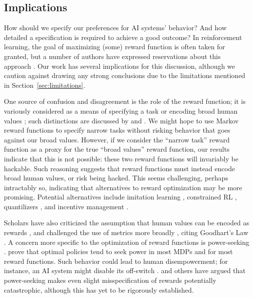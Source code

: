 \documentclass{article}
\theoremstyle{definition}
\theoremstyle{remark}
\begin{document}
\subsection{Implications}\label{sec:implications}

How should we specify our preferences for AI systems' behavior?
And how detailed a specification is required to achieve a good outcome?
In reinforcement learning, the goal of maximizing (some) reward function is often taken for granted, but a number of authors have expressed reservations about this approach \citep{gabriel2020artificial, Dobbe2021hard, Hadfield2016Cooperative, hadfield2017inverse, bostrom2014superintelligence}.
Our work has several implications for this discussion, although we caution against drawing any strong conclusions due to the limitations mentioned in Section~\ref{sec:limitations}.

One source of confusion and disagreement is the role of the reward function; it is variously considered as a means of specifying a task \citep{leike2018scalable} or encoding broad human values \citep{Dewey2011learning}; such distinctions are discussed by \citet{christiano_narrow_alignment} and \citet{gabriel2020artificial}.
We might hope to use Markov reward functions to specify narrow tasks without risking behavior that goes against our broad values.
However, if we consider the ``narrow task'' reward function as a proxy for the true ``broad values'' reward function, our results indicate that this is not possible: these two reward functions will invariably be hackable.
Such reasoning suggests that reward functions must instead encode broad human values, or risk being hacked.
This seems challenging, perhaps intractably so, indicating that alternatives to reward optimization may be more promising.
Potential alternatives include imitation learning \citep{ross2011reduction}, 
constrained RL \citep{Csaba2020con}, quantilizers \citep{taylor2016quantilizers}, and incentive management \citep{everitt2019understanding}.





Scholars have also criticized the assumption that human values can be encoded as rewards \citep{Dobbe2021hard}, and challenged the use of metrics more broadly \citep{oneil2016weapons,thomas2022reliance}, citing Goodhart's Law \citep{Manheim2018Categorizing, goodhart1984problems}.
A concern more specific to the optimization of reward functions is power-seeking \citep{turner2021optimalneurips, bostrom2012superintelligent, omohundro2008basic}.
\citet{turner2021optimalneurips} prove that optimal policies tend to seek power in most MDPs and for most reward functions. 
Such behavior could lead to human disempowerment; for instance, an AI system might disable its off-switch \citep{Hadfield2016the}.
\citet{bostrom2014superintelligence} and others have argued that power-seeking makes even slight misspecification of rewards potentially catastrophic, although this has yet to be rigorously established.
\end{document}
